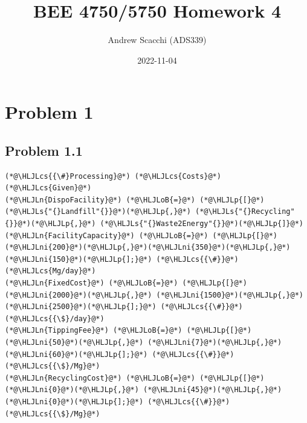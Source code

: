 \documentclass[12pt,a4paper]{article}
\title{ BEE 4750/5750 Homework 4 }
\author{ Andrew Scacchi (ADS339) }
\date{ 2022-11-04 }
\newcommand{\HLJLn}[1]{#1}
\newcommand{\HLJLs}[1]{\textcolor[RGB]{201,61,57}{#1}}
\newcommand{\HLJLni}[1]{\textcolor[RGB]{59,151,46}{#1}}
\newcommand{\HLJLoB}[1]{\textcolor[RGB]{102,102,102}{\textbf{#1}}}
\newcommand{\HLJLp}[1]{#1}
\newcommand{\HLJLcs}[1]{\textcolor[RGB]{153,153,119}{\textit{#1}}}
\begin{document}
\maketitle



\section{Problem 1}
\subsection{Problem 1.1}

\begin{lstlisting}
(*@\HLJLcs{{\#}Processing}@*) (*@\HLJLcs{Costs}@*) (*@\HLJLcs{Given}@*)
(*@\HLJLn{DispoFacility}@*) (*@\HLJLoB{=}@*) (*@\HLJLp{[}@*)(*@\HLJLs{"{}Landfill"{}}@*)(*@\HLJLp{,}@*) (*@\HLJLs{"{}Recycling"{}}@*)(*@\HLJLp{,}@*) (*@\HLJLs{"{}Waste2Energy"{}}@*)(*@\HLJLp{]}@*)
(*@\HLJLn{FacilityCapacity}@*) (*@\HLJLoB{=}@*) (*@\HLJLp{[}@*)(*@\HLJLni{200}@*)(*@\HLJLp{,}@*)(*@\HLJLni{350}@*)(*@\HLJLp{,}@*)(*@\HLJLni{150}@*)(*@\HLJLp{];}@*) (*@\HLJLcs{{\#}}@*) (*@\HLJLcs{Mg/day}@*)
(*@\HLJLn{FixedCost}@*) (*@\HLJLoB{=}@*) (*@\HLJLp{[}@*)(*@\HLJLni{2000}@*)(*@\HLJLp{,}@*) (*@\HLJLni{1500}@*)(*@\HLJLp{,}@*) (*@\HLJLni{2500}@*)(*@\HLJLp{];}@*) (*@\HLJLcs{{\#}}@*) (*@\HLJLcs{{\$}/day}@*)
(*@\HLJLn{TippingFee}@*) (*@\HLJLoB{=}@*) (*@\HLJLp{[}@*)(*@\HLJLni{50}@*)(*@\HLJLp{,}@*) (*@\HLJLni{7}@*)(*@\HLJLp{,}@*) (*@\HLJLni{60}@*)(*@\HLJLp{];}@*) (*@\HLJLcs{{\#}}@*) (*@\HLJLcs{{\$}/Mg}@*)
(*@\HLJLn{RecyclingCost}@*) (*@\HLJLoB{=}@*) (*@\HLJLp{[}@*)(*@\HLJLni{0}@*)(*@\HLJLp{,}@*) (*@\HLJLni{45}@*)(*@\HLJLp{,}@*) (*@\HLJLni{0}@*)(*@\HLJLp{];}@*) (*@\HLJLcs{{\#}}@*) (*@\HLJLcs{{\$}/Mg}@*)


\end{lstlisting}
\end{document}
